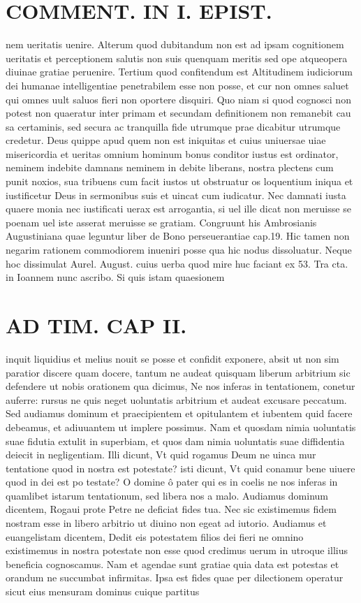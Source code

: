 \documentclass{article}
\begin{document}
\begin{pages}
\section*{COMMENT. IN I. EPIST. }\pstart nem ueritatis uenire. Alterum quod dubitandum non est ad ipsam cognitionem ueritatis et perceptionem salutis non suis quenquam meritis sed ope atqueopera diuinae gratiae peruenire. Tertium quod confitendum est Altitudinem iudiciorum dei humanae intelligentiae penetrabilem esse non posse, et cur non omnes saluet qui omnes uult saluos fieri non oportere disquiri. Quo niam si quod cognosci non potest non quaeratur inter primam et secundam definitionem non remanebit cau sa certaminis, sed secura ac tranquilla fide utrumque prae dicabitur utrumque credetur. Deus quippe apud quem non est iniquitas et cuius uniuersae uiae misericordia et ueritas omnium hominum bonus conditor iustus est ordinator, neminem indebite damnans neminem in debite liberans, nostra plectens cum punit noxios, sua tribuens cum facit iustos ut obstruatur os loquentium iniqua et iustificetur Deus in sermonibus suis et uincat cum iudicatur. Nec damnati iusta quaere monia nec iustificati uerax est arrogantia, si uel ille dicat non meruisse se poenam uel iste asserat meruisse se gratiam. Congruunt his Ambrosianis Augustiniana quae leguntur liber  de Bono perseuerantiae cap.19. Hic tamen non negarim rationem commodiorem inueniri posse qua hic nodus dissoluatur. Neque hoc dissimulat Aurel. August. cuius uerba quod mire huc faciant ex 53. Tra cta. in Ioannem nunc ascribo. Si quis istam quaesionem  \pend
\section*{AD TIM. CAP II. }
\marginpar{[ p.114 ]}\pstart inquit liquidius et melius nouit se posse et confidit exponere, absit ut non sim paratior discere quam docere, tantum ne audeat quisquam liberum arbitrium sic defendere ut nobis orationem qua dicimus, Ne nos inferas in tentationem, conetur auferre: rursus ne quis neget uoluntatis arbitrium et audeat excusare peccatum. Sed audiamus dominum et praecipientem et opitulantem et iubentem quid facere debeamus, et adiuuantem ut implere possimus. Nam et quosdam nimia uoluntatis suae fidutia extulit in superbiam, et quos dam nimia uoluntatis suae diffidentia deiecit in negligentiam. Illi dicunt, Vt quid rogamus Deum ne uinca mur tentatione quod in nostra est potestate? isti dicunt, Vt quid conamur bene uiuere quod in dei est po testate? O domine ô pater qui es in coelis ne nos inferas in quamlibet istarum tentationum, sed libera nos a malo. Audiamus dominum dicentem, Rogaui prote Petre ne deficiat fides tua. Nec sic existimemus fidem nostram esse in libero arbitrio ut diuino non egeat ad iutorio. Audiamus et euangelistam dicentem, Dedit eis potestatem filios dei fieri ne omnino existimemus in nostra potestate non esse quod credimus uerum in utroque illius beneficia cognoscamus. Nam et agendae sunt gratiae quia data est potestas et orandum ne succumbat infirmitas. Ipsa est fides quae per dilectionem operatur sicut eius mensuram dominus cuique partitus  \pend

\end{pages}
\end{document}
